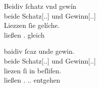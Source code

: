 \begin{exe}
\ex\label{ex:papstkoenig2}
\begin{xlist}
	\ex \label{ex:papstkoenig2_1}
		\gll Beidiv ſchatz vnd gewín \\
			beide Schatz[\Acc.\Sg.\MascI] und Gewinn[\Acc.\Sg.\MascI] \\
	\sn \gll Liezzen ſie gelíche. \\
			ließen \Tpl\subM.\Nom{} gleich \\
		\begin{taggedline}{\parencite[\pno~29\vb, 38]{kc:VB}}
		\trans {}
		\end{taggedline}

	\ex \label{ex:papstkoenig2_2}
		\gll baidiv ſcaz unde gewin. \\
			beide Schatz[\Acc.\Sg.\MascI] und Gewinn[\Acc.\Sg.\MascI] \\
	\sn \gll liezen ſi in beſlifen. \\
			ließen \Tpl\subM.\Nom{} \Refl.\Dat.\Pl\subM{} entgehen \\
		\begin{taggedline}{\parencites[\pno~26\rb, 40--41]{kc:A1}[vgl.]%
			[\pno~36\ra, 40--41]{kc:H}%
			[6112--6113]{schroeder1895}}
		\trans {}
		\end{taggedline}
\end{xlist}
\end{exe}


